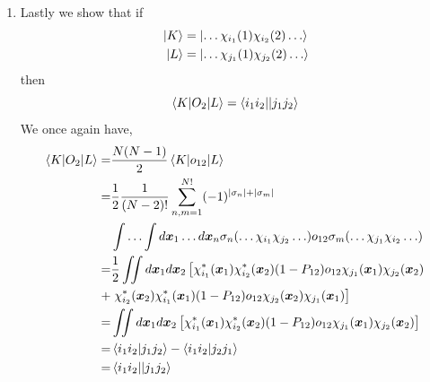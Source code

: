\begin{enumerate}
so that we get
\[
\begin{aligned}
\braket{K|O_2|L} =& \frac{1}{2}\sum_{i_2\ne i_1}\iint d\vec{x}_1
d\vec{x}_2\left[\chi_{i_1}^\ast(\vec{x}_1)\chi_{i_2}^\ast(\vec{x}_2)
    (1 - P_{12})o_{12}\chi_{j_1}(\vec{x}_1)\chi_{i_2}(\vec{x}_2)\right. \\
 +& \left.\chi_{i_1}^\ast(\vec{x}_2)\chi_{i_2}^\ast(\vec{x}_1)(1 - P_{12})o_{12}
 \chi_{j_1}(\vec{x}_2)\chi_{i_2}(\vec{x}_1)\right] 
\end{aligned}
\]
The second term is the same as the first one if we interchange the variables
of integration. Here we assume that $o_{12}$ like $|\vec{r}_1 - \vec{r}_2|$ is
symmetric in the two coordiates. Therefore,
\[
\begin{aligned}
\braket{K|O_2|L} &= \sum_{i_2\ne i_1}\iint d\vec{x}_1
d\vec{x}_2\left[\chi_{i_1}^\ast(\vec{x}_1)\chi_{i_2}^\ast(\vec{x}_2)
 (1 - P_{12})o_{12} \chi_{j_1}(\vec{x}_1)\chi_{i_2}(\vec{x}_2)\right] \\
 &=\sum_{i_2\ne i_1}\left(\braket{i_1i_2|j_1i_2}-\braket{i_2i_1|i_2j_1}\right)\\
 &= \braket{i_1i_2||j_1i_2}
\end{aligned}
\]

\item\label{s2r9} Lastly we show that if
\[
\begin{aligned}
\ket{K} &= \ket{\ldots\chi_{i_1}(1)\chi_{i_2}(2)\ldots} \\
\ket{L} &= \ket{\ldots\chi_{j_1}(1)\chi_{j_2}(2)\ldots}
\end{aligned}
\]
then
\begin{equation}\label{c2e100}
\braket{K|O_2|L} = \braket{i_1i_2||j_1j_2}
\end{equation}
We once again have,
\[
\begin{aligned}
\braket{K|O_2|L} =& \frac{N(N-1)}{2}\braket{K|o_{12}|L} \\
 =& \frac{1}{2}\frac{1}{(N-2)!}\sum_{n,m=1}^{N!}(-1)^{|\sigma_n|+|\sigma_m|} \\
  & \int\ldots\int d\bm{x}_1\ldots d\bm{x}_n \sigma_n(\ldots\chi_{i_1}
  \chi_{j_2}\ldots)o_{12}\sigma_m(\ldots\chi_{j_1}\chi_{i_2}\ldots) \\
 =& \frac{1}{2}\iint d\bm{x}_1d\bm{x}_2\left[ 
 \chi_{i_1}^\ast(\bm{x}_1)\chi_{i_2}^\ast(\bm{x}_2)(1 - P_{12})o_{12}
 \chi_{j_1}(\bm{x}_1)\chi_{j_2}(\bm{x}_2)\right.\\
 +& \left.\chi_{i_2}^\ast(\bm{x}_2)\chi_{i_1}^\ast(\bm{x}_1)(1 - P_{12})o_{12}
 \chi_{j_2}(\bm{x}_2)\chi_{j_1}(\bm{x}_1)\right]\\
 =& \iint d\bm{x}_1d\bm{x}_2\left[\chi_{i_1}^\ast(\bm{x}_1)\chi_{i_2}^\ast
 (\bm{x}_2)(1 - P_{12})o_{12}\chi_{j_1}(\bm{x}_1)\chi_{j_2}(\bm{x}_2)\right]\\
 =& \braket{i_1i_2|j_1j_2} - \braket{i_1i_2|j_2j_1} \\
 =& \braket{i_1i_2||j_1j_2}
\end{aligned}
\]


\end{enumerate}
